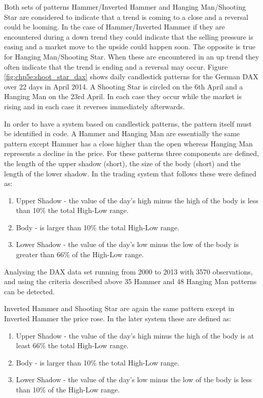 Both sets of patterns Hammer/Inverted Hammer and Hanging Man/Shooting Star are considered to indicate that a trend is coming to a close and a reversal could be looming. In the case of Hammer/Inverted Hammer if they are encountered during a down trend they could indicate that the selling pressure is easing and a market move to the upside could happen soon. The opposite is true for Hanging Man/Shooting Star. When these are encountered in an up trend they often indicate that the trend is ending and a reversal may occur. Figure \ref{fig:chp5e:shoot_star_dax} shows daily candlestick patterns for the German DAX over 22 days in April 2014. A Shooting Star is circled on the 6th April and a Hanging Man on the 23rd April. In each case they occur while the market is rising and in each case it reverses immediately afterwards.

In order to have a system based on candlestick patterns, the pattern itself must be identified in code. A Hammer and Hanging Man are essentially the same pattern except Hammer has a close higher than the open whereas Hanging Man represents a decline in the price. For these patterns three components are defined, the length of the upper shadow (short), the size of the body (short) and the length of the lower shadow. In the trading system that follows these were defined as:

\begin{enumerate}
\item Upper Shadow - the value of the day's high minus the high of the body is less than 10\% the total High-Low range.
\item Body - is larger than 10\% the total High-Low range.
\item Lower Shadow - the value of the day's low minus the low of the body is greater than 66\% of the High-Low range.
\end{enumerate}

Analysing the DAX data set running from 2000 to 2013 with 3570 observations, and using the criteria described above 35 Hammer and 48 Hanging Man patterns can be detected. 

Inverted Hammer and Shooting Star are again the same pattern except in Inverted Hammer the price rose. In the later system these are defined as:

\begin{enumerate}
\item Upper Shadow - the value of the day's high minus the high of the body is at least 66\% the total High-Low range.
\item Body - is larger than 10\% the total High-Low range.
\item Lower Shadow - the value of the day's low minus the low of the body is less than 10\% of the High-Low range.
\end{enumerate}


